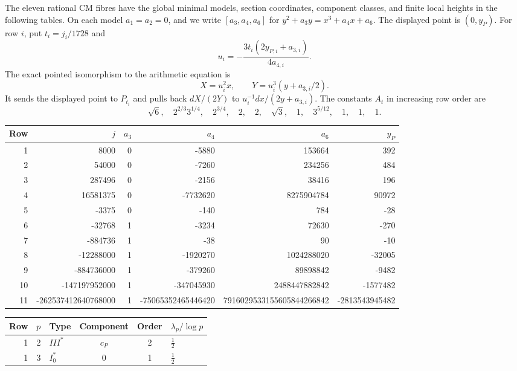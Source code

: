 \begin{proposition}\hypertarget{tag-000X}{}\label{ari:C.6.3}

The eleven rational CM fibres have the global minimal models,
section coordinates, component classes, and finite local heights
in the following tables. On each model $a_1=a_2=0$, and we
write $[a_3,a_4,a_6]$ for
$y^2+a_3y=x^3+a_4x+a_6$. The displayed point is $(0,y_P)$.
For row $i$, put $t_i=j_i/1728$ and
\[
 u_i=-\frac{3t_i(2y_{P,i}+a_{3,i})}{4a_{4,i}}.
\]
The exact pointed isomorphism to the arithmetic equation is
\[
 X=u_i^2x,\qquad Y=u_i^3(y+a_{3,i}/2).
\]
It sends the displayed point to $P_{t_i}$ and pulls back
$dX/(2Y)$ to $u_i^{-1}dx/(2y+a_{3,i})$.
The constants $A_t$ in increasing row order are
\[
 \sqrt6,\quad 2^{2/3}3^{1/4},\quad 2^{3/4},\quad
 2,\quad 2,\quad \sqrt3,\quad 1,\quad 3^{5/12},\quad
 1,\quad1,\quad1.
\]
\begingroup\normalfont\footnotesize\setlength{\tabcolsep}{4pt}
\begin{longtable}{r r r r r r}
\toprule Row & $j$ & $a_3$ & $a_4$ & $a_6$ & $y_P$\\\midrule\endhead
1 & 8000 & 0 & -5880 & 153664 & 392\\
2 & 54000 & 0 & -7260 & 234256 & 484\\
3 & 287496 & 0 & -2156 & 38416 & 196\\
4 & 16581375 & 0 & -7732620 & 8275904784 & 90972\\
5 & -3375 & 0 & -140 & 784 & -28\\
6 & -32768 & 1 & -3234 & 72630 & -270\\
7 & -884736 & 1 & -38 & 90 & -10\\
8 & -12288000 & 1 & -1920270 & 1024288020 & -32005\\
9 & -884736000 & 1 & -379260 & 89898842 & -9482\\
10 & -147197952000 & 1 & -347045930 & 2488447882842 & -1577482\\
11 & -262537412640768000 & 1 & -75065352465446420 & 7916029533155605844266842 & -2813543945482\\
\bottomrule\end{longtable}
\begin{longtable}{r r l c c l}
\toprule Row & $p$ & Type & Component & Order & $\lambda_p/\log p$\\\midrule\endhead
1 & 2 & $III^*$ & $c_P$ & 2 & $\frac{1}{2}$\\
1 & 3 & $I_0^*$ & $0$ & 1 & $\frac{1}{2}$\\

\end{longtable}
\end{proposition}
